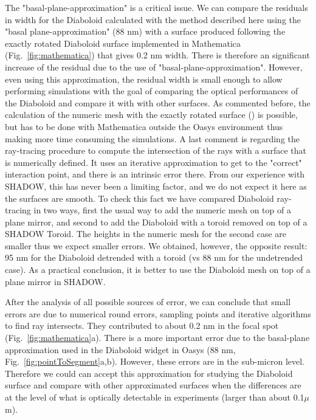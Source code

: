 \documentclass{iucr}              %
\begin{document}
The "basal-plane-approximation" is a critical issue. We can compare the residuals in width for the Diaboloid calculated with the method described here using the "basal plane-approximation" (88 nm) with a surface produced following the exactly rotated Diaboloid surface \cite{Valeriy2020b} implemented in Mathematica \cite{lacey}  (Fig.~\ref{fig:mathematica}) that gives 0.2 nm width. There is therefore an significant increase of the residual due to the use of "basal-plane-approximation". However, even using this approximation, the residual width is small enough to allow performing simulations with the goal of comparing the optical performances of the Diaboloid and compare it with with other surfaces. As commented before, the calculation of the numeric mesh with the exactly rotated surface (\cite{Valeriy2020b}) is possible, but has to be done with Mathematica outside the Oasys environment thus making more time consuming the simulations.  A last comment is regarding the ray-tracing procedure to compute the intersection of the rays with a surface that is numerically defined. It uses an iterative approximation to get to the "correct" interaction point, and there is an intrinsic error there. From our experience with SHADOW, this has never been a limiting factor, and we do not expect it here as the surfaces are smooth. To check this fact we have compared  Diaboloid ray-tracing in two ways, first the usual way to add the numeric mesh on top of a plane mirror, and second to add the Diaboloid with a toroid removed on top of a SHADOW Toroid. The heights in the numeric mesh for the second case are smaller thus we expect smaller errors. We obtained, however, the opposite result: 95 nm for the Diaboloid detrended with a toroid (vs 88 nm for the undetrended case). As a practical conclusion, it is better to use the Diaboloid mesh on top of a plane mirror in SHADOW.

After the analysis of all possible sources of error, we can conclude that small errors are due to numerical round errors, sampling points and iterative algorithms to find ray intersects. They contributed to about 0.2 nm in the focal spot (Fig.~\ref{fig:mathematica}a). There is a more important error due to the basal-plane approximation used in the Diaboloid widget in Oasys (88 nm, Fig.~\ref{fig:pointToSegment}a,b). However, these errors are in the sub-micron level. Therefore we could can accept this approximation for studying the Diaboloid surface and compare with other approximated surfaces when the differences are at the level of what is optically detectable in experiments (larger than about 0.1$\mu$m).
\end{document}
